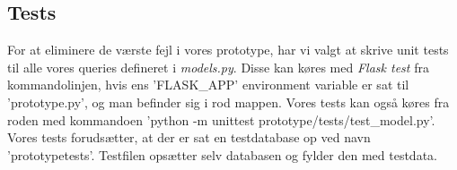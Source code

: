 \subsection{Tests}
For at eliminere de værste fejl i vores prototype, har vi valgt at skrive unit tests til alle vores queries defineret i \textit{models.py}. Disse kan køres med \textit{Flask test} fra kommandolinjen, hvis ens 'FLASK\_APP' environment variable er sat til 'prototype.py', og man befinder sig i rod mappen. Vores tests kan også køres fra roden med kommandoen 'python -m unittest prototype/tests/test\_model.py'.\\
Vores tests forudsætter, at der er sat en testdatabase op ved navn 'prototypetests'. Testfilen opsætter selv databasen og fylder den med testdata.
